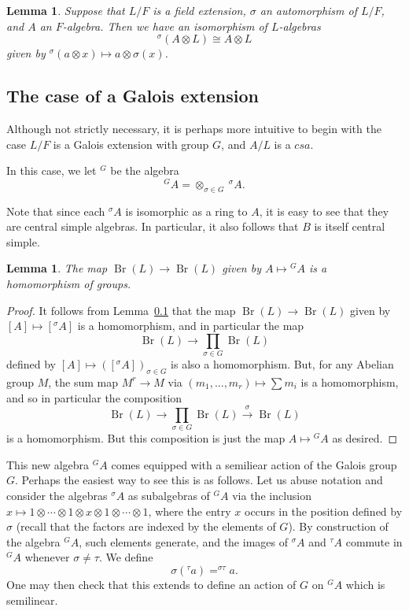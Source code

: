 \documentclass[12pt]{report}
\theoremstyle{plain}
\newtheorem{lem}[thm]{Lemma}
\newcommand{\oper}[1]{\operatorname{#1}}
\newcommand{\Br}{\oper{Br}}
\begin{document}
\begin{lem}
Suppose that $L/F$ is a field extension, $\sigma$ an automorphism of $L/F$,
and $A$ an $F$-algebra. Then we have an isomorphism of $L$-algebras
\[^\sigma(A \otimes L) \cong A \otimes L \]
given by $^\sigma(a \otimes x) \mapsto a \otimes \sigma(x)$.
\end{lem}

\subsection{The case of a Galois extension}

Although not strictly necessary, it is perhaps more intuitive to begin
with the case $L/F$ is a Galois extension with group $G$, and $A/L$ is a
$csa$. 

In this case, we let $^G $ be the algebra
\[^G A = \otimes_{\sigma \in G} \ ^\sigma A. \]

Note that since each $^\sigma A$ is isomorphic as a ring to $A$, it is easy
to see that they are central simple algebras. In particular, it also
follows that $B$ is itself central simple.

\begin{lem}
The map $\Br(L) \to \Br(L)$ given by $A \mapsto {}^G A$ is a homomorphism of
groups.
\end{lem}
\begin{proof}
It follows from Lemma~\ref{} that the map $\Br(L) \to \Br(L)$ given by $[A]
\mapsto [{}^\sigma A]$ is a homomorphism, and in particular the map
\[\Br(L) \to \prod_{\sigma \in G} \Br(L) \]
defined by $[A] \mapsto \left([{}^\sigma A]\right)_{\sigma \in G}$ is also
a homomorphism. But, for any Abelian group $M$, the sum map
$M^r \to M$ via $(m_1, \ldots, m_r) \mapsto \sum m_i$ is a homomorphism,
and so in particular the composition
\[\Br(L) \to \prod_{\sigma \in G} \Br(L) \overset\sigma\to \Br(L) \]
is a homomorphism. But this composition is just the map $A \mapsto {}^G A$
as desired.
\end{proof}

This new algebra $^G A$ comes equipped with a semiliear action of the
Galois group $G$. Perhaps the easiest way to see this is as follows. Let us
abuse notation and consider the algebras $^\sigma A$ as subalgebras of $^G
A$ via the inclusion $x \mapsto 1 \otimes \cdots \otimes 1 \otimes x
\otimes 1 \otimes \cdots \otimes 1$, where the entry $x$ occurs in the
position defined by $\sigma$ (recall that the factors are indexed by the
elements of $G$). By construction of the algebra $^G A$, such elements
generate, and the images of $^\sigma A$ and $^\tau A$ commute in $^G A$
whenever $\sigma \neq \tau$. We define
\[\sigma(^\tau a) = ^{\sigma \tau} a. \] One may then check that this
extends to define an action of $G$ on $^G A$ which is semilinear.
\end{document}
